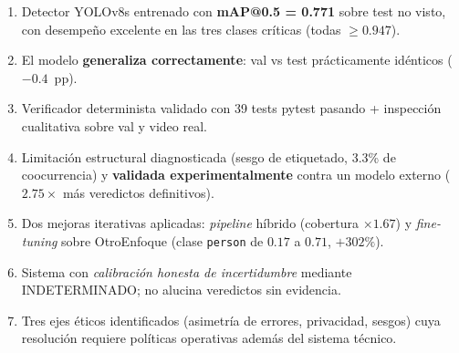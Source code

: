 \documentclass[conference]{IEEEtran}
\begin{document}
\begin{enumerate}
    \item Detector YOLOv8s entrenado con \textbf{mAP@0.5 = 0.771}
    sobre test no visto, con desempeño excelente en las tres clases
    críticas (todas $\geq 0.947$).

    \item El modelo \textbf{generaliza correctamente}: val vs test
    prácticamente idénticos ($-0.4$~pp).

    \item Verificador determinista validado con 39 tests pytest
    pasando + inspección cualitativa sobre val y video real.

    \item Limitación estructural diagnosticada (sesgo de etiquetado,
    3.3\% de coocurrencia) y \textbf{validada experimentalmente}
    contra un modelo externo ($2.75\times$ más veredictos
    definitivos).

    \item Dos mejoras iterativas aplicadas: \emph{pipeline} híbrido
    (cobertura $\times 1.67$) y \emph{fine-tuning} sobre OtroEnfoque
    (clase \texttt{person} de $0.17$ a $0.71$, $+302\%$).

    \item Sistema con \emph{calibración honesta de incertidumbre}
    mediante INDETERMINADO; no alucina veredictos sin evidencia.

    \item Tres ejes éticos identificados (asimetría de errores,
    privacidad, sesgos) cuya resolución requiere políticas
    operativas además del sistema técnico.
\end{enumerate}
\end{document}
